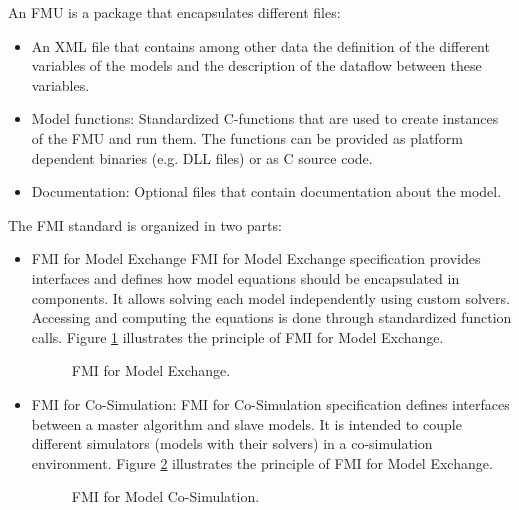 

An FMU is a package that encapsulates different files:

\begin{itemize}
\item An XML file that contains among other data the definition of the different variables of the models and the description of the dataflow between these variables. 
\item Model functions: Standardized C-functions that are used to create instances of the FMU and run them. The functions can be provided as platform dependent binaries (e.g. DLL files) or as C source code.
\item Documentation: Optional files that contain documentation about the model.
\end{itemize}

The FMI standard is organized in two parts:
\begin{itemize}
\item FMI for Model Exchange
FMI for Model Exchange specification provides interfaces and defines how model equations should be encapsulated in components. It allows solving each model independently using custom solvers. Accessing and computing the equations is done through standardized function calls. Figure \ref{fig:fmimdlexg} illustrates the principle of FMI for Model Exchange.

\begin{figure}[phbt]
\centering

\caption{FMI for Model Exchange.}
\label{fig:fmimdlexg}
\end{figure}

\item FMI for Co-Simulation:
FMI for Co-Simulation specification defines interfaces between a master algorithm and slave models. It is intended to couple different simulators (models with their solvers) in a co-simulation environment. Figure \ref{fig:fmicosim} illustrates the principle of FMI for Model Exchange.

\begin{figure}[phbt]
\centering

\caption{FMI for Model Co-Simulation.}
\label{fig:fmicosim}
\end{figure} 
\end{itemize}

